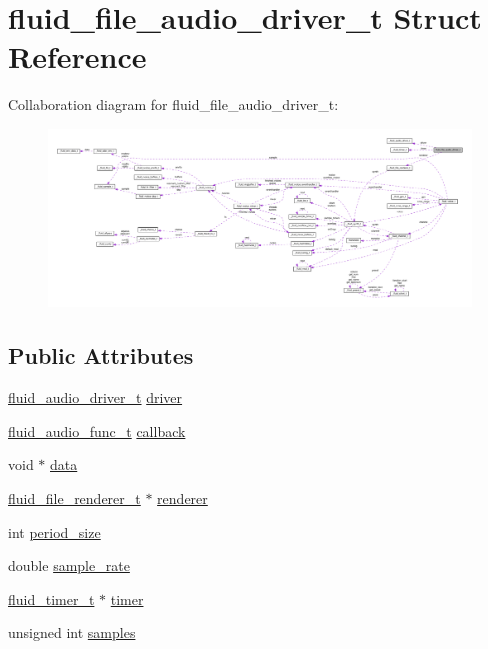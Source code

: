 \hypertarget{structfluid__file__audio__driver__t}{}\section{fluid\+\_\+file\+\_\+audio\+\_\+driver\+\_\+t Struct Reference}
\label{structfluid__file__audio__driver__t}


Collaboration diagram for fluid\+\_\+file\+\_\+audio\+\_\+driver\+\_\+t\+:
\nopagebreak
\begin{figure}[H]
\begin{center}
\leavevmode
\includegraphics[width=350pt]{structfluid__file__audio__driver__t__coll__graph}
\end{center}
\end{figure}
\subsection*{Public Attributes}
\begin{DoxyCompactItemize}
\item 
\hyperlink{types_8h_ac3706330ce49cac5b7dd079e90d376d8}{fluid\+\_\+audio\+\_\+driver\+\_\+t} \hyperlink{structfluid__file__audio__driver__t_a19a5f2e3643ae6053802ecbef57e2fac}{driver}
\item 
\hyperlink{audio_8h_a3bcb63db55c58403dad66496422ec462}{fluid\+\_\+audio\+\_\+func\+\_\+t} \hyperlink{structfluid__file__audio__driver__t_a46eed8dd1583bb7491a5054c65a8d6ce}{callback}
\item 
void $\ast$ \hyperlink{structfluid__file__audio__driver__t_a801ff0f68f423cb09ab1f642177e39f3}{data}
\item 
\hyperlink{types_8h_a8e8a634da121763271ed819dfe866b3d}{fluid\+\_\+file\+\_\+renderer\+\_\+t} $\ast$ \hyperlink{structfluid__file__audio__driver__t_a2ebf13f23559a4a80825696c7256beed}{renderer}
\item 
int \hyperlink{structfluid__file__audio__driver__t_ae73ab9a948f4b6538334d15305446887}{period\+\_\+size}
\item 
double \hyperlink{structfluid__file__audio__driver__t_aa15523e6a932e3e6284536981fb6e17d}{sample\+\_\+rate}
\item 
\hyperlink{fluid__sys_8h_a520742276ee4ea4bf140e6e6be79e4ae}{fluid\+\_\+timer\+\_\+t} $\ast$ \hyperlink{structfluid__file__audio__driver__t_aa241650d18c8de47867c2362c21aefed}{timer}
\item 
unsigned int \hyperlink{structfluid__file__audio__driver__t_ac326afd759af50eb03dfe1a7281b4d46}{samples}
\end{DoxyCompactItemize}



